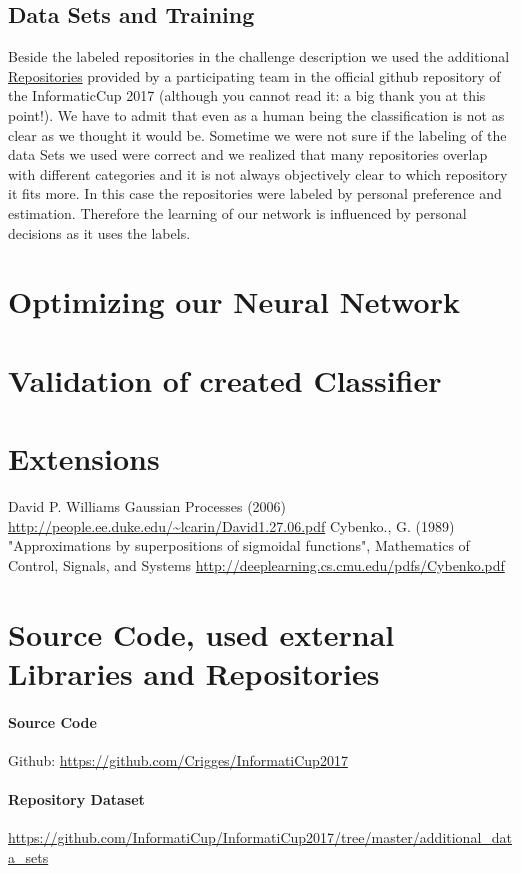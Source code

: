 \documentclass[paper=A4,pagesize=auto,12pt,headinclude=true,footinclude=true,BCOR=0mm,DIV=calc]{scrartcl}
\begin{document}
	\subsection{Data Sets and Training}
	Beside the labeled repositories in the challenge description we used the additional \hyperref[src:Repositories]{Repositories} provided by a participating team in the official github repository of the InformaticCup 2017 (although you cannot read it: a big thank you at this point!). We have to admit that even as a human being the classification is not as clear as we thought it would be. Sometime we were not sure if the labeling of the data Sets we used were correct and we realized that many repositories overlap with different categories and it is not always objectively clear to which repository it fits more. In this case the repositories were labeled by personal preference and estimation. Therefore the learning of our network is influenced by personal decisions as it uses the labels.
	\section{Optimizing our Neural Network }

	
	\section{Validation of created Classifier}
	
	\section{Extensions}
	
	
	
	\newpage
	
	\begin{thebibliography}{xxxxxx}
		 David P. Williams Gaussian Processes (2006) \url{http://people.ee.duke.edu/~lcarin/David1.27.06.pdf}
		  Cybenko., G. (1989) "Approximations by superpositions of sigmoidal functions", Mathematics of Control, Signals, and Systems \url{http://deeplearning.cs.cmu.edu/pdfs/Cybenko.pdf}
	\end{thebibliography}
	
	
	\section{Source Code, used external Libraries and Repositories}
	\paragraph{Source Code}
	Github: \url{https://github.com/Crigges/InformatiCup2017}\\
	\paragraph{Repository Dataset}
	\label{src:Repositories}
	\url{https://github.com/InformatiCup/InformatiCup2017/tree/master/additional_data_sets}
	
\end{document}
